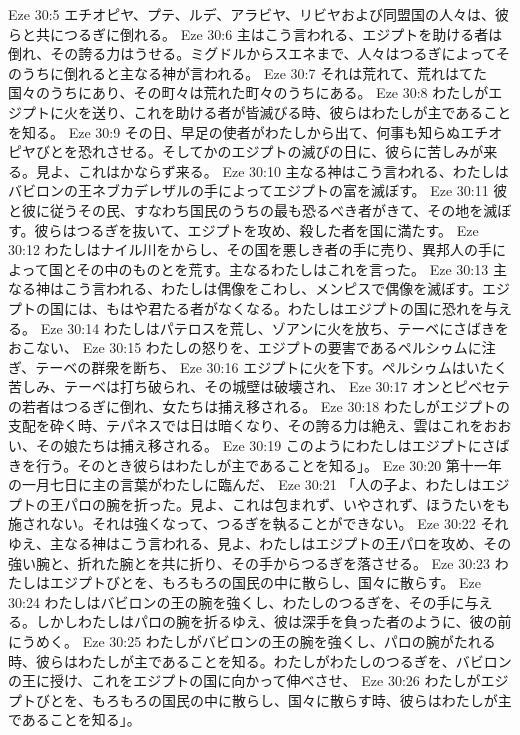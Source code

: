 Eze 30:5  エチオピヤ、プテ、ルデ、アラビヤ、リビヤおよび同盟国の人々は、彼らと共につるぎに倒れる。
Eze 30:6  主はこう言われる、エジプトを助ける者は倒れ、その誇る力はうせる。ミグドルからスエネまで、人々はつるぎによってそのうちに倒れると主なる神が言われる。
Eze 30:7  それは荒れて、荒れはてた国々のうちにあり、その町々は荒れた町々のうちにある。
Eze 30:8  わたしがエジプトに火を送り、これを助ける者が皆滅びる時、彼らはわたしが主であることを知る。
Eze 30:9  その日、早足の使者がわたしから出て、何事も知らぬエチオピヤびとを恐れさせる。そしてかのエジプトの滅びの日に、彼らに苦しみが来る。見よ、これはかならず来る。
Eze 30:10  主なる神はこう言われる、わたしはバビロンの王ネブカデレザルの手によってエジプトの富を滅ぼす。
Eze 30:11  彼と彼に従うその民、すなわち国民のうちの最も恐るべき者がきて、その地を滅ぼす。彼らはつるぎを抜いて、エジプトを攻め、殺した者を国に満たす。
Eze 30:12  わたしはナイル川をからし、その国を悪しき者の手に売り、異邦人の手によって国とその中のものとを荒す。主なるわたしはこれを言った。
Eze 30:13  主なる神はこう言われる、わたしは偶像をこわし、メンピスで偶像を滅ぼす。エジプトの国には、もはや君たる者がなくなる。わたしはエジプトの国に恐れを与える。
Eze 30:14  わたしはパテロスを荒し、ゾアンに火を放ち、テーベにさばきをおこない、
Eze 30:15  わたしの怒りを、エジプトの要害であるペルシゥムに注ぎ、テーベの群衆を断ち、
Eze 30:16  エジプトに火を下す。ペルシゥムはいたく苦しみ、テーベは打ち破られ、その城壁は破壊され、
Eze 30:17  オンとピベセテの若者はつるぎに倒れ、女たちは捕え移される。
Eze 30:18  わたしがエジプトの支配を砕く時、テパネスでは日は暗くなり、その誇る力は絶え、雲はこれをおおい、その娘たちは捕え移される。
Eze 30:19  このようにわたしはエジプトにさばきを行う。そのとき彼らはわたしが主であることを知る」。
Eze 30:20  第十一年の一月七日に主の言葉がわたしに臨んだ、
Eze 30:21  「人の子よ、わたしはエジプトの王パロの腕を折った。見よ、これは包まれず、いやされず、ほうたいをも施されない。それは強くなって、つるぎを執ることができない。
Eze 30:22  それゆえ、主なる神はこう言われる、見よ、わたしはエジプトの王パロを攻め、その強い腕と、折れた腕とを共に折り、その手からつるぎを落させる。
Eze 30:23  わたしはエジプトびとを、もろもろの国民の中に散らし、国々に散らす。
Eze 30:24  わたしはバビロンの王の腕を強くし、わたしのつるぎを、その手に与える。しかしわたしはパロの腕を折るゆえ、彼は深手を負った者のように、彼の前にうめく。
Eze 30:25  わたしがバビロンの王の腕を強くし、パロの腕がたれる時、彼らはわたしが主であることを知る。わたしがわたしのつるぎを、バビロンの王に授け、これをエジプトの国に向かって伸べさせ、
Eze 30:26  わたしがエジプトびとを、もろもろの国民の中に散らし、国々に散らす時、彼らはわたしが主であることを知る」。

